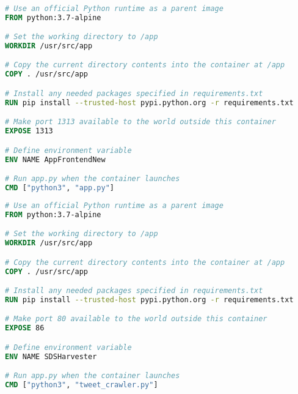 \begin{mdframed}
\begin{lstlisting}[language=Dockerfile,label=docker_code_1, caption=Tweet Harvester DockerFile]

# Use an official Python runtime as a parent image
FROM python:3.7-alpine

# Set the working directory to /app
WORKDIR /usr/src/app

# Copy the current directory contents into the container at /app
COPY . /usr/src/app

# Install any needed packages specified in requirements.txt
RUN pip install --trusted-host pypi.python.org -r requirements.txt

# Make port 1313 available to the world outside this container
EXPOSE 1313

# Define environment variable
ENV NAME AppFrontendNew

# Run app.py when the container launches
CMD ["python3", "app.py"]
\end{lstlisting}
\end{mdframed}

\begin{mdframed}
\begin{lstlisting}[language=Dockerfile,label=docker_code_2, caption= User Interface App DockerFile]
# Use an official Python runtime as a parent image
FROM python:3.7-alpine

# Set the working directory to /app
WORKDIR /usr/src/app

# Copy the current directory contents into the container at /app
COPY . /usr/src/app

# Install any needed packages specified in requirements.txt
RUN pip install --trusted-host pypi.python.org -r requirements.txt

# Make port 80 available to the world outside this container
EXPOSE 86

# Define environment variable
ENV NAME SDSHarvester

# Run app.py when the container launches
CMD ["python3", "tweet_crawler.py"]
\end{lstlisting}
\end{mdframed}